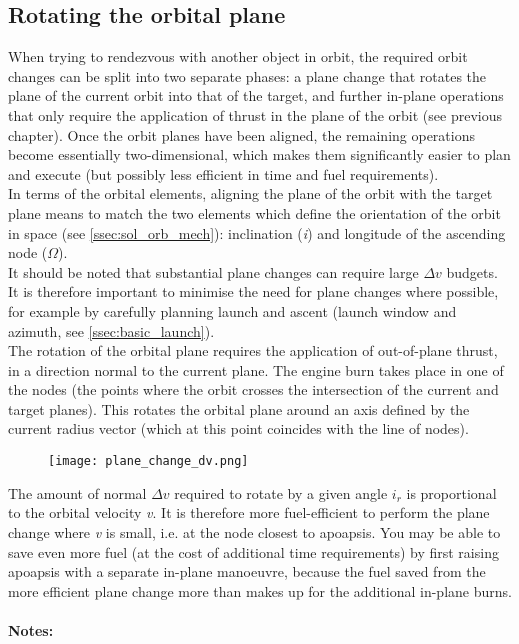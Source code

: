 \documentclass[Orbiter User Manual.tex]{subfiles}
\begin{document}
\subsection{Rotating the orbital plane}
\label{ssec:basic_plane}
When trying to rendezvous with another object in orbit, the required orbit changes can be split into two separate phases: a plane change that rotates the plane of the current orbit into that of the target, and further in-plane operations that only require the application of thrust in the plane of the orbit (see previous chapter). Once the orbit planes have been aligned, the remaining operations become essentially two-dimensional, which makes them significantly easier to plan and execute (but possibly less efficient in time and fuel requirements).\\
In terms of the orbital elements, aligning the plane of the orbit with the target plane means to match the two elements which define the orientation of the orbit in space (see \ref{ssec:sol_orb_mech}): inclination (\textit{i}) and longitude of the ascending node ($\Omega$).\\
It should be noted that substantial plane changes can require large $\Delta v$ budgets. It is therefore important to minimise the need for plane changes where possible, for example by carefully planning launch and ascent (launch window and azimuth, see \ref{ssec:basic_launch}).\\
The rotation of the orbital plane requires the application of out-of-plane thrust, in a direction normal to the current plane. The engine burn takes place in one of the nodes (the points where the orbit crosses the intersection of the current and target planes). This rotates the orbital plane around an axis defined by the current radius vector (which at this point coincides with the line of nodes).

\begin{figure}[H]
	\centering
	\texttt{[image: plane\_change\_dv.png]}
\end{figure}

\noindent
The amount of normal $\Delta v$ required to rotate by a given angle $i_{r}$ is proportional to the orbital velocity \textit{v}. It is therefore more fuel-efficient to perform the plane change where \textit{v} is small, i.e. at the node closest to apoapsis. You may be able to save even more fuel (at the cost of additional time requirements) by first raising apoapsis with a separate in-plane manoeuvre, because the fuel saved from the more efficient plane change more than makes up for the additional in-plane burns.\\
\\
\textbf{Notes:}
\end{document}
